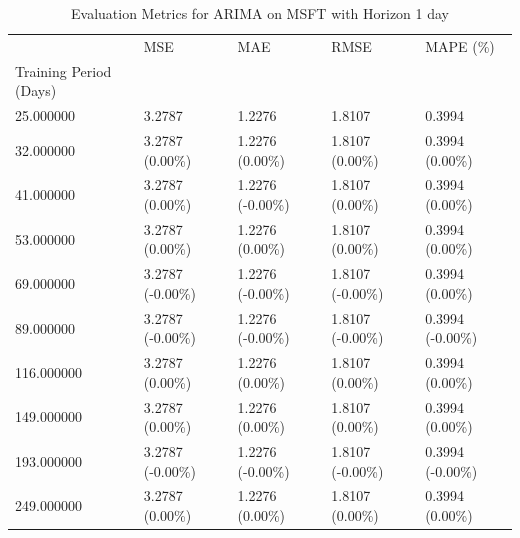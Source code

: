 \begin{table}
\caption{Evaluation Metrics for ARIMA on MSFT with Horizon 1 day}
\label{tab:arima_MSFT_h1_metrics}
\begin{tabular}{lllll}
\toprule
 & MSE & MAE & RMSE & MAPE (\%) \\
Training Period (Days) &  &  &  &  \\
\midrule
25.000000 & 3.2787 & 1.2276 & 1.8107 & 0.3994 \\
32.000000 & 3.2787 (0.00\%) & 1.2276 (0.00\%) & 1.8107 (0.00\%) & 0.3994 (0.00\%) \\
41.000000 & 3.2787 (0.00\%) & 1.2276 (-0.00\%) & 1.8107 (0.00\%) & 0.3994 (0.00\%) \\
53.000000 & 3.2787 (0.00\%) & 1.2276 (0.00\%) & 1.8107 (0.00\%) & 0.3994 (0.00\%) \\
69.000000 & 3.2787 (-0.00\%) & 1.2276 (-0.00\%) & 1.8107 (-0.00\%) & 0.3994 (0.00\%) \\
89.000000 & 3.2787 (-0.00\%) & 1.2276 (-0.00\%) & 1.8107 (-0.00\%) & 0.3994 (-0.00\%) \\
116.000000 & 3.2787 (0.00\%) & 1.2276 (0.00\%) & 1.8107 (0.00\%) & 0.3994 (0.00\%) \\
149.000000 & 3.2787 (0.00\%) & 1.2276 (0.00\%) & 1.8107 (0.00\%) & 0.3994 (0.00\%) \\
193.000000 & 3.2787 (-0.00\%) & 1.2276 (-0.00\%) & 1.8107 (-0.00\%) & 0.3994 (-0.00\%) \\
249.000000 & 3.2787 (0.00\%) & 1.2276 (0.00\%) & 1.8107 (0.00\%) & 0.3994 (0.00\%) \\
\bottomrule
\end{tabular}
\end{table}
